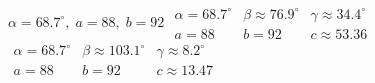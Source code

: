 { $\alpha = 68.7^{\circ}, \; a = 88, \; b = 92$}
{$\begin{array}{lll}\alpha = 68.7^{\circ} & \beta \approx 76.9^{\circ} & \gamma \approx 34.4^{\circ} \\a = 88 & b = 92 & c \approx 53.36 \end{array}$\\$\begin{array}{lll}\alpha = 68.7^{\circ} & \beta \approx 103.1^{\circ} & \gamma \approx 8.2^{\circ} \\a = 88 & b = 92 & c \approx 13.47\end{array}$}
